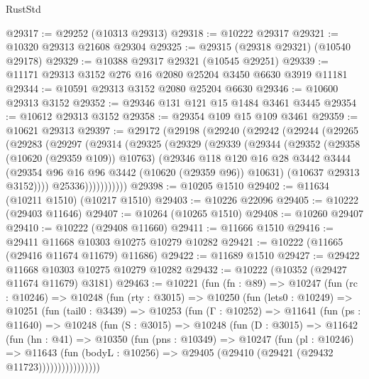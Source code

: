 \begin{lexlean}{RustStd}
\begin{coremodule}
@29317 := @29252 (@10313 @29313)
@29318 := @10222 @29317
@29321 := @10320 @29313 @21608 @29304
@29325 := @29315 (@29318 @29321) (@10540 @29178)
@29329 := @10388 @29317 @29321 (@10545 @29251)
@29339 := @11171 @29313 @3152 @276 @16 @2080 @25204 @3450 @6630 @3919 @11181
@29344 := @10591 @29313 @3152 @2080 @25204 @6630
@29346 := @10600 @29313 @3152
@29352 := @29346 @131 @121 @15 @1484 @3461 @3445
@29354 := @10612 @29313 @3152
@29358 := @29354 @109 @15 @109 @3461
@29359 := @10621 @29313
@29397 := @29172
    (@29198
      (@29240
        (@29242
          (@29244
            (@29265
              (@29283
                (@29297
                  (@29314
                    (@29325
                      (@29329
                        (@29339
                          (@29344
                            (@29352
                              (@29358 (@10620 (@29359 @109)) @10763)
                              (@29346
                                @118
                                @120
                                @16
                                @28
                                @3442
                                @3444
                                (@29354 @96 @16 @96 @3442 (@10620 (@29359 @96)) @10631)
                                (@10637 @29313 @3152))))
                          @25336)))))))))))
@29398 := @10205 @1510
@29402 := @11634 (@10211 @1510) (@10217 @1510)
@29403 := @10226 @22096
@29405 := @10222 (@29403 @11646)
@29407 := @10264 (@10265 @1510)
@29408 := @10260 @29407
@29410 := @10222 (@29408 @11660)
@29411 := @11666 @1510
@29416 := @29411 @11668 @10303 @10275 @10279 @10282
@29421 := @10222 (@11665 (@29416 @11674 @11679) @11686)
@29422 := @11689 @1510
@29427 := @29422 @11668 @10303 @10275 @10279 @10282
@29432 := @10222 (@10352 (@29427 @11674 @11679) @3181)
@29463 := @10221
    (fun (fn : @89) =>
    @10247
      (fun (rc : @10246) =>
      @10248
        (fun (rty : @3015) =>
        @10250
          (fun (lets0 : @10249) =>
          @10251
            (fun (tail0 : @3439) =>
            @10253
              (fun (Γ : @10252) =>
              @11641
                (fun (ps : @11640) =>
                @10248
                  (fun (S : @3015) =>
                  @10248
                    (fun (D : @3015) =>
                    @11642
                      (fun (hn : @41) =>
                      @10350
                        (fun (pns : @10349) =>
                        @10247
                          (fun (pl : @10246) =>
                          @11643
                            (fun (bodyL : @10256) =>
                            @29405 (@29410 (@29421 (@29432 @11723))))))))))))))))

\end{coremodule}
\end{lexlean}
